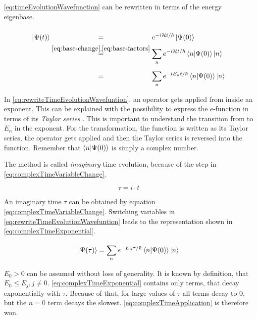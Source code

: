 \autoref{eq:timeEvolutionWavefunction} can be rewritten in terms of the energy eigenbase.

\begin{equation}
    \label{eq:rewriteTimeEvolutionWavefuntion}
    \begin{split}
        \ket{\Psi(t)} &\stackrel{\phantom{\ref{eq:base-change}, \ref{eq:base-factors}}}{=} e^{-i\hamiltonian t / \hbar} \ket{\Psi(0)} \\
        &\stackrel{\ref{eq:base-change}, \ref{eq:base-factors}}{=}
        \sum\limits_{n}^{} e^{-i \hamiltonian t / \hbar} \bra{n}\ket{\Psi(0)} \ket{n}\\
        &\stackrel{\phantom{\ref{eq:base-change}, \ref{eq:base-factors}}}{=}
        \sum\limits_{n}^{} e^{-i E_n t / \hbar} \bra{n}\ket{\Psi(0)} \ket{n}
    \end{split}
\end{equation}

In \autoref{eq:rewriteTimeEvolutionWavefuntion}, an operator gets applied from inside an exponent. This can be explained with the possibility to express the $e$-function in terms of its \emph{Taylor series} \cite{schwablQM}. This is important to understand the transition from \hamiltonian to $E_n$ in the exponent. For the transformation, the function is written as its Taylor series, the operator gets applied and then the Taylor series is reversed into the function. Remember that $\bra{n}\ket{\Psi(0)}$ is simply a complex number.

The method is called \emph{imaginary} time evolution, because of the step in \autoref{eq:complexTimeVariableChange}.

\begin{equation}
    \label{eq:complexTimeVariableChange}
    \tau = i\cdot t
\end{equation}

An \glqq imaginary\grqq{} time $\tau$ can be obtained by equation \autoref{eq:complexTimeVariableChange}. Switching variables in \autoref{eq:rewriteTimeEvolutionWavefuntion} leads to the representation shown in \autoref{eq:complexTimeExponential}.

\begin{equation}
    \label{eq:complexTimeExponential}
    \ket{\Psi(\tau)} = \sum\limits_{n}^{} e^{-E_n \tau / \hbar} \bra{n}\ket{\Psi(0)} \ket{n}
\end{equation}

$E_0 > 0$ can be assumed without loss of generality.
It is known by definition, that $E_0 \leq E_j, j\neq 0$. 
\autoref{eq:complexTimeExponential} contains only terms, that decay exponentially with $\tau$.
Because of that, for large values of $\tau$ all terms decay to 0, but the $n=0$ term decays the slowest. \autoref{eq:complexTimeApplication} is therefore won.

